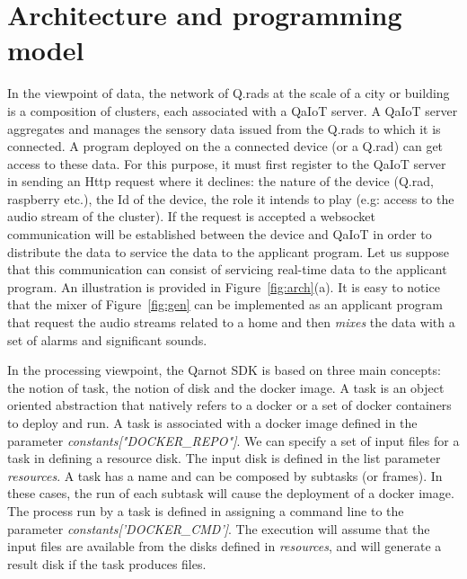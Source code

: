 \documentclass[10pt, conference, compsocconf]{IEEEtran}
\begin{document}
\section{Architecture and programming model} \label{Model}

In the viewpoint of data, the network of Q.rads at the scale of a city or building is a composition of clusters, each 
associated with a QaIoT server. A QaIoT server aggregates and manages the sensory data issued from the Q.rads to which it is 
connected. A program deployed on the a connected device (or a Q.rad) can get access to these data. For this purpose, 
it must first register to the QaIoT server in sending an Http request where it declines: the nature of the device (Q.rad, 
raspberry etc.), the Id of the device, the role it intends to play (e.g: access to the audio stream of the cluster). If the 
request is accepted a websocket communication will  be established between the device and QaIoT in order to distribute the data 
to service the data to the applicant program. Let us suppose that this communication can consist of servicing real-time data 
to the applicant program. An illustration is provided in Figure~\ref{fig:arch}(a). 
It is easy to notice that the mixer of Figure~\ref{fig:gen} can be implemented as an applicant program that request the audio streams  
related to a home and then {\it mixes} the data with a set of alarms and significant sounds.

In the processing viewpoint, the Qarnot SDK is based on three main concepts: the notion of task, 
the notion of disk and the docker image. A task is an object oriented abstraction that natively refers to a 
docker or a set of docker containers to deploy and run. A task is associated with a docker image defined in the 
parameter {\it constants["DOCKER\_REPO"]}. We can specify a set of input files for a task in defining a resource disk. 
The input disk is defined in the list parameter {\it resources}. A task has a name and can be composed by subtasks (or frames).  
In these cases, the run of each subtask will cause the deployment of a docker image. The process run by a task is defined in 
assigning a command line to the parameter {\it constants['DOCKER\_CMD']}. The execution will assume that the input files are available 
from the disks defined in {\it resources}, and will generate a result disk if the task produces files.
\end{document}
